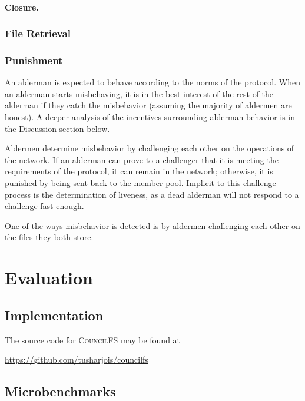 \documentclass{article}
\begin{document}
\paragraph{Closure.}

\subsubsection{File Retrieval}

\subsubsection{Punishment}

An alderman is expected to behave according to the norms of the protocol. When
an alderman starts misbehaving, it is in the best interest of the rest of the
alderman if they catch the misbehavior (assuming the majority of aldermen are
honest). A deeper analysis of the incentives surrounding alderman behavior is in
the Discussion section below.

Aldermen determine misbehavior by challenging each other on the operations of
the network. If an alderman can prove to a challenger that it is meeting the
requirements of the protocol, it can remain in the network; otherwise, it is
punished by being sent back to the member pool. Implicit to this challenge
process is the determination of liveness, as a dead alderman will not respond to
a challenge fast enough.

One of the ways misbehavior is detected is by aldermen challenging each other on
the files they both store.


\section{Evaluation}

\subsection{Implementation}

The source code for \textsc{CouncilFS} may be found at
\begin{center}
  \url{https://github.com/tusharjois/councilfs}
\end{center}

\subsection{Microbenchmarks}
\end{document}
